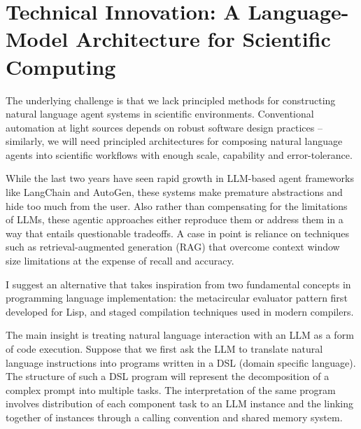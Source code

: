 \documentclass{article}
\begin{document}
\section{Technical Innovation: A Language-Model Architecture for Scientific Computing}
The underlying challenge is that we lack principled methods for constructing natural language agent systems in scientific environments. Conventional automation at light sources depends on robust software design practices --  similarly, we will need principled architectures for composing natural language agents into scientific workflows with enough scale, capability and error-tolerance.


While the last two years have seen rapid growth in LLM-based agent frameworks like LangChain and AutoGen, these systems make premature abstractions and hide too much from the user. Also rather than compensating for the limitations of LLMs, these agentic approaches either reproduce them or address them in a way that entails questionable tradeoffs. A case in point is reliance on techniques such as retrieval-augmented generation (RAG) that overcome context window size limitations at the expense of recall and accuracy.

I suggest an alternative that takes inspiration from two fundamental concepts in programming language implementation: the metacircular evaluator pattern first developed for Lisp, and staged compilation techniques used in modern compilers.

The main insight is treating natural language interaction with an LLM as a form of code execution. Suppose that we first ask the LLM to translate natural language instructions into programs written in a DSL (domain specific language). The structure of such a DSL program will represent the decomposition of a complex prompt into multiple tasks. The interpretation of the same program involves distribution of each component task to an LLM instance and the linking together of instances through a calling convention and shared memory system.
\end{document}
